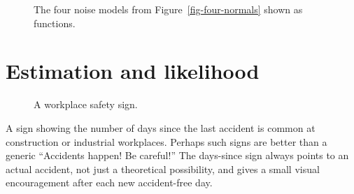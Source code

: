 \documentclass[
  letterpaper,
  DIV=11,
  numbers=noendperiod,
  oneside]{scrartcl}
\begin{document}
\begin{figure}


\caption{\label{fig-dnorm-4}The four noise models from
Figure~\ref{fig-four-normals} shown as functions.}

\end{figure}%

\newpage

\section{Estimation and likelihood}\label{sec-likelihood}

\begin{figure}


\caption{\label{fig-work-safety-sign}A workplace safety sign.}

\end{figure}%

A sign showing the number of days since the last accident is common at
construction or industrial workplaces. Perhaps such signs are better
than a generic ``Accidents happen! Be careful!'' The days-since sign
always points to an actual accident, not just a theoretical possibility,
and gives a small visual encouragement after each new accident-free day.
\end{document}
